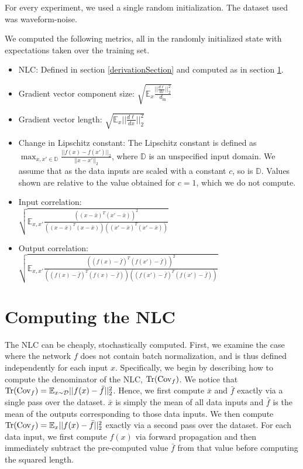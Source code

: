 \documentclass{article} %
\begin{document}
For every experiment, we used a single random initialization. The dataset used was waveform-noise.

We computed the following metrics, all in the randomly initialized state with expectations taken over the training set.

\begin{itemize}
\item NLC: Defined in section \ref{derivationSection} and computed as in section \ref{computingSection}.
\item Gradient vector component size: $\sqrt{\mathbb{E}_x\frac{||\frac{d\ell}{dx}||_2^2}{d_\text{in}}}$
\item Gradient vector length: $\sqrt{\mathbb{E}_x||\frac{d\ell}{dx}||_2^2}$
\item Change in Lipschitz constant: The Lipschitz constant is defined as $\max_{x,x' \in \mathbb{D}} \frac{||f(x)-f(x')||_2}{||x-x'||_2}$, where $\mathbb{D}$ is an unspecified input domain. We assume that as the data inputs are scaled with a constant $c$, so is $\mathbb{D}$. Values shown are relative to the value obtained for $c=1$, which we do not compute.
\item Input correlation: \\$\sqrt{\mathbb{E}_{x,x'}\frac{((x-\bar{x})^T(x'-\bar{x}))^2}{((x-\bar{x})^T(x-\bar{x}))((x'-\bar{x})^T(x'-\bar{x}))}}$
\item Output correlation: \\$\sqrt{\mathbb{E}_{x,x'}\frac{((f(x)-\bar{f})^T(f(x')-\bar{f}))^2}{((f(x)-\bar{f})^T(f(x)-\bar{f}))((f(x')-\bar{f})^T(f(x')-\bar{f}))}}$
\end{itemize}

\section{Computing the NLC} \label{computingSection}

The NLC can be cheaply, stochastically computed. First, we examine the case where the network $f$ does not contain batch normalization, and is thus defined independently for each input $x$. Specifically, we begin by describing how to compute the denominator of the NLC, $\operatorname{Tr}(\mathrm{Cov}_f)$. We notice that $\operatorname{Tr}(\mathrm{Cov}_f) = \mathbb{E}_{x\sim \mathcal{D}} ||f(x) - \bar{f}||_2^2$. Hence, we first compute $\bar{x}$ and $\bar{f}$ exactly via a single pass over the dataset. $\bar{x}$ is simply the mean of all data inputs and $\bar{f}$ is the mean of the outputs corresponding to those data inputs. We then compute $\operatorname{Tr}(\mathrm{Cov}_f) = \mathbb{E}_x ||f(x) - \bar{f}||_2^2$ exactly via a second pass over the dataset. For each data input, we first compute $f(x)$ via forward propagation and then immediately subtract the pre-computed value $\bar{f}$ from that value before computing the squared length. 
\end{document}
